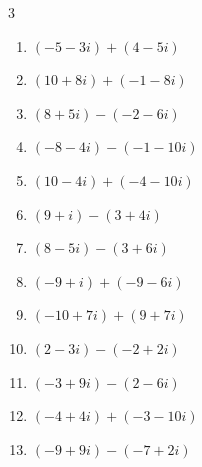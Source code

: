 \begin{multicols}{3}
\begin{enumerate}
  \item $\displaystyle (-5-3i) + (4-5i)$

        \phantom{$\displaystyle =-1-8i$}

  \item $\displaystyle (10+8i) + (-1-8i)$

        \phantom{$\displaystyle =9$}

  \item $\displaystyle (8+5i) - (-2-6i)$

        \phantom{$\displaystyle =10+11i$}

  \item $\displaystyle (-8-4i) - (-1-10i)$

        \phantom{$\displaystyle =-7+6i$}

  \item $\displaystyle (10-4i) + (-4-10i)$

        \phantom{$\displaystyle =6-14i$}

  \item $\displaystyle (9+i) - (3+4i)$

        \phantom{$\displaystyle =6-3i$}

  \item $\displaystyle (8-5i) - (3+6i)$

        \phantom{$\displaystyle =5-11i$}

  \item $\displaystyle (-9+i) + (-9-6i)$

        \phantom{$\displaystyle =-18-5i$}

  \item $\displaystyle (-10+7i) + (9+7i)$

        \phantom{$\displaystyle =-1+14i$}

\columnbreak %

  \item $\displaystyle (2-3i) - (-2+2i)$

        \phantom{$\displaystyle =4-5i$}

  \item $\displaystyle (-3+9i) - (2-6i)$

        \phantom{$\displaystyle =-5+15i$}

  \item $\displaystyle (-4+4i) + (-3-10i)$

        \phantom{$\displaystyle =-7-6i$}

  \item $\displaystyle (-9+9i) - (-7+2i)$


\end{enumerate}
\end{multicols}
